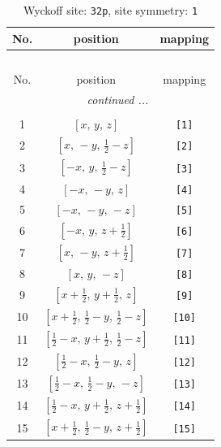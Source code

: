 \documentclass[fleqn,8pt]{jsarticle}
\begin{document}
\renewcommand{\arraystretch}{1.2}
\begin{longtable}{ccc}
\caption{Wyckoff site: {\tt 32p}, site symmetry: {\tt 1}}
 \\
 \hline \hline
No. & position & mapping \\ \hline \endfirsthead

\multicolumn{2}{l}{\tablename\ \thetable{}} \\
 \hline \hline
No. & position & mapping \\ \hline \endhead

 \hline \hline
\multicolumn{2}{r}{\footnotesize\it continued ...} \\ \endfoot

 \hline \hline
\multicolumn{2}{r}{} \\ \endlastfoot

1 & $\left[ x,\, y,\, z \right]$ & {\tt [1]} \\ \hline
2 & $\left[ x,\, - y,\, \frac{1}{2} - z \right]$ & {\tt [2]} \\ \hline
3 & $\left[ - x,\, y,\, \frac{1}{2} - z \right]$ & {\tt [3]} \\ \hline
4 & $\left[ - x,\, - y,\, z \right]$ & {\tt [4]} \\ \hline
5 & $\left[ - x,\, - y,\, - z \right]$ & {\tt [5]} \\ \hline
6 & $\left[ - x,\, y,\, z + \frac{1}{2} \right]$ & {\tt [6]} \\ \hline
7 & $\left[ x,\, - y,\, z + \frac{1}{2} \right]$ & {\tt [7]} \\ \hline
8 & $\left[ x,\, y,\, - z \right]$ & {\tt [8]} \\ \hline
9 & $\left[ x + \frac{1}{2},\, y + \frac{1}{2},\, z \right]$ & {\tt [9]} \\ \hline
10 & $\left[ x + \frac{1}{2},\, \frac{1}{2} - y,\, \frac{1}{2} - z \right]$ & {\tt [10]} \\ \hline
11 & $\left[ \frac{1}{2} - x,\, y + \frac{1}{2},\, \frac{1}{2} - z \right]$ & {\tt [11]} \\ \hline
12 & $\left[ \frac{1}{2} - x,\, \frac{1}{2} - y,\, z \right]$ & {\tt [12]} \\ \hline
13 & $\left[ \frac{1}{2} - x,\, \frac{1}{2} - y,\, - z \right]$ & {\tt [13]} \\ \hline
14 & $\left[ \frac{1}{2} - x,\, y + \frac{1}{2},\, z + \frac{1}{2} \right]$ & {\tt [14]} \\ \hline
15 & $\left[ x + \frac{1}{2},\, \frac{1}{2} - y,\, z + \frac{1}{2} \right]$ & {\tt [15]} \\ \hline

\end{longtable}
\end{document}
